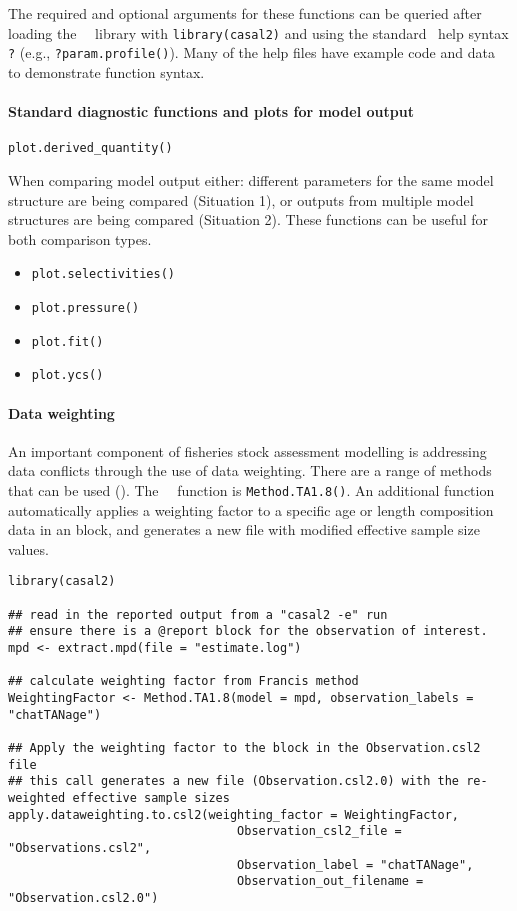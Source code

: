 The required and optional arguments for these functions can be queried after loading the \CNAME\ \R\ library with \texttt{library(casal2)} and using the standard \R\ help syntax \texttt{?} (e.g., \texttt{?param.profile()}). Many of the help files have example code and data to demonstrate function syntax.

\paragraph*{Standard diagnostic functions and plots for model output}


\texttt{plot.derived\_quantity()}

When comparing model output either: different parameters for the same model structure are being compared (Situation 1), or outputs from multiple model structures are being compared (Situation 2). These functions can be useful for both comparison types.

\begin{itemize}
	\item \texttt{plot.selectivities()}
	\item \texttt{plot.pressure()}
	\item \texttt{plot.fit()}
	\item \texttt{plot.ycs()}
\end{itemize}

\paragraph*{Data weighting}

An important component of fisheries stock assessment modelling is addressing data conflicts through the use of data weighting. There are a range of methods that can be used (\cite{francis2011data}). The \CNAME\ \R\ function is \texttt{Method.TA1.8()}. An additional function  automatically applies a weighting factor to a specific age or length composition data in an  block, and generates a new  file with modified effective sample size values.

\begin{lstlisting}
library(casal2)

## read in the reported output from a "casal2 -e" run
## ensure there is a @report block for the observation of interest.
mpd <- extract.mpd(file = "estimate.log")

## calculate weighting factor from Francis method
WeightingFactor <- Method.TA1.8(model = mpd, observation_labels = "chatTANage")

## Apply the weighting factor to the block in the Observation.csl2 file
## this call generates a new file (Observation.csl2.0) with the re-weighted effective sample sizes
apply.dataweighting.to.csl2(weighting_factor = WeightingFactor,
                                Observation_csl2_file = "Observations.csl2",
                                Observation_label = "chatTANage",
                                Observation_out_filename = "Observation.csl2.0")
\end{lstlisting}


